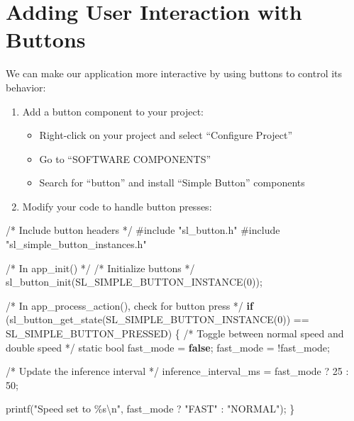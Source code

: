 \documentclass[
  9pt,
  letterpaper,
  abstract,
  titlepage]{scrbook}
\newenvironment{Shaded}{\begin{snugshade}}{\end{snugshade}}
\newcommand{\CommentTok}[1]{\textcolor[rgb]{0.37,0.37,0.37}{#1}}
\newcommand{\ControlFlowTok}[1]{\textcolor[rgb]{0.00,0.23,0.31}{\textbf{#1}}}
\newcommand{\DataTypeTok}[1]{\textcolor[rgb]{0.68,0.00,0.00}{#1}}
\newcommand{\DecValTok}[1]{\textcolor[rgb]{0.68,0.00,0.00}{#1}}
\newcommand{\ImportTok}[1]{\textcolor[rgb]{0.00,0.46,0.62}{#1}}
\newcommand{\KeywordTok}[1]{\textcolor[rgb]{0.00,0.23,0.31}{\textbf{#1}}}
\newcommand{\NormalTok}[1]{\textcolor[rgb]{0.00,0.23,0.31}{#1}}
\newcommand{\OperatorTok}[1]{\textcolor[rgb]{0.37,0.37,0.37}{#1}}
\newcommand{\PreprocessorTok}[1]{\textcolor[rgb]{0.68,0.00,0.00}{#1}}
\newcommand{\SpecialCharTok}[1]{\textcolor[rgb]{0.37,0.37,0.37}{#1}}
\newcommand{\StringTok}[1]{\textcolor[rgb]{0.13,0.47,0.30}{#1}}
\providecommand{\tightlist}{%
  \setlength{\itemsep}{0pt}\setlength{\parskip}{0pt}}\usepackage{longtable,booktabs,array}
\def\tightlist{}
\let\tightlist\relax
\begin{document}
\section{Adding User Interaction with
Buttons}\label{adding-user-interaction-with-buttons}

We can make our application more interactive by using buttons to control
its behavior:

\begin{enumerate}
\def\labelenumi{\arabic{enumi}.}
\tightlist
\item
  Add a button component to your project:

  \begin{itemize}
  \tightlist
  \item
    Right-click on your project and select ``Configure Project''
  \item
    Go to ``SOFTWARE COMPONENTS''
  \item
    Search for ``button'' and install ``Simple Button'' components
  \end{itemize}
\item
  Modify your code to handle button presses:
\end{enumerate}

\begin{Shaded}
\begin{Highlighting}[]
\CommentTok{/* Include button headers */}
\PreprocessorTok{\#include }\ImportTok{"sl\_button.h"}
\PreprocessorTok{\#include }\ImportTok{"sl\_simple\_button\_instances.h"}

\CommentTok{/* In app\_init() */}
\CommentTok{/* Initialize buttons */}
\NormalTok{sl\_button\_init}\OperatorTok{(}\NormalTok{SL\_SIMPLE\_BUTTON\_INSTANCE}\OperatorTok{(}\DecValTok{0}\OperatorTok{));}

\CommentTok{/* In app\_process\_action(), check for button press */}
\ControlFlowTok{if} \OperatorTok{(}\NormalTok{sl\_button\_get\_state}\OperatorTok{(}\NormalTok{SL\_SIMPLE\_BUTTON\_INSTANCE}\OperatorTok{(}\DecValTok{0}\OperatorTok{))} \OperatorTok{==}\NormalTok{ SL\_SIMPLE\_BUTTON\_PRESSED}\OperatorTok{)} \OperatorTok{\{}
  \CommentTok{/* Toggle between normal speed and double speed */}
  \DataTypeTok{static} \DataTypeTok{bool}\NormalTok{ fast\_mode }\OperatorTok{=} \KeywordTok{false}\OperatorTok{;}
\NormalTok{  fast\_mode }\OperatorTok{=} \OperatorTok{!}\NormalTok{fast\_mode}\OperatorTok{;}
  
  \CommentTok{/* Update the inference interval */}
\NormalTok{  inference\_interval\_ms }\OperatorTok{=}\NormalTok{ fast\_mode }\OperatorTok{?} \DecValTok{25} \OperatorTok{:} \DecValTok{50}\OperatorTok{;}
  
\NormalTok{  printf}\OperatorTok{(}\StringTok{"Speed set to }\SpecialCharTok{\%s\textbackslash{}n}\StringTok{"}\OperatorTok{,}\NormalTok{ fast\_mode }\OperatorTok{?} \StringTok{"FAST"} \OperatorTok{:} \StringTok{"NORMAL"}\OperatorTok{);}
\OperatorTok{\}}
\end{Highlighting}
\end{Shaded}
\end{document}
